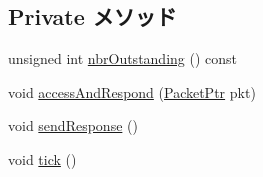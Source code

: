 \subsection*{Private メソッド}
\begin{DoxyCompactItemize}
\item 
unsigned int \hyperlink{classDRAMSim2_a034e8a2b3dd91f3ad9ca116c60aa3ea5}{nbrOutstanding} () const 
\item 
void \hyperlink{classDRAMSim2_a26aa336cb4192aab04418121f361fa49}{accessAndRespond} (\hyperlink{classPacket}{PacketPtr} pkt)
\item 
void \hyperlink{classDRAMSim2_a07982d2ae9430f5cd468e15bb4920ea4}{sendResponse} ()
\item 
void \hyperlink{classDRAMSim2_a873dd91783f9efb4a590aded1f70d6b0}{tick} ()
\end{DoxyCompactItemize}
